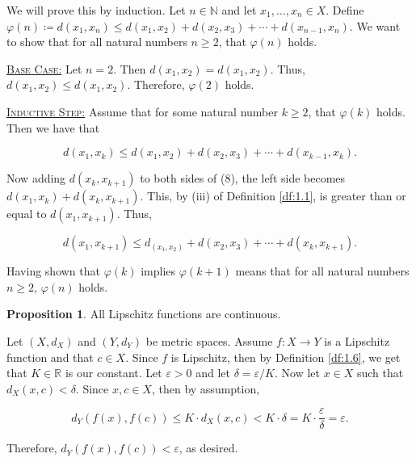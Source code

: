 \documentclass{article}
\makeatletter
\theoremstyle{definition}
\newtheorem{prop}{Proposition}[section]
\theoremstyle{remark}
\let\oldproofname=\proofname
\renewcommand{\proofname}{\bf{\textit{\oldproofname}}}
\theoremstyle{definition}
\renewenvironment{proof}[1][\proofname]{\par
  \pushQED{\qed}%
  \normalfont \topsep6\p@\@plus6\p@\relax
  \list{}{\leftmargin=0mm
          \rightmargin=0mm
          \settowidth{\itemindent}{\itshape#1}%
          \labelwidth=\itemindent
          \parsep=0pt \listparindent=0mm%
  }
  \item[\hskip\labelsep
        \itshape
    #1\@addpunct{.}]\ignorespaces
}{%
  \popQED\endlist\@endpefalse
}
\makeatother
\begin{document}
    \begin{proof}
        We will prove this by induction. Let $n\in\mathbb{N}$ and let $x_1,\dots,x_n\in X$. Define $\varphi(n)\coloneqq d(x_1,x_n)\leq d(x_1,x_2)+d(x_2,x_3)+\cdots+d(x_{n-1},x_n)$. We want to show that for all natural numbers $n\geq 2$, that $\varphi(n)$ holds.
        
        \vspace{4mm}
        
        \hspace{4mm}\underline{\textsc{Base Case:}} Let $n=2$. Then $d(x_1,x_2)=d(x_1,x_2)$. Thus, $d(x_1,x_2)\leq d(x_1,x_2)$. Therefore, $\varphi(2)$ holds.
        
        \vspace{4mm}
        
        \hspace{4mm}\underline{\textsc{Inductive Step:}} Assume that for some natural number $k\geq 2$, that $\varphi(k)$ holds. Then we have that 
        
        \begin{equation}
            d(x_1,x_k)\leq d(x_1,x_2)+d(x_2,x_3)+\cdots+d(x_{k-1},x_k).
        \end{equation}
        
        Now adding $d(x_k,x_{k+1})$ to both sides of (8), the left side becomes $d(x_1,x_k)+d(x_k,x_{k+1})$. This, by (iii) of Definition \ref{df:1.1}, is greater than or equal to $d(x_1,x_{k+1})$. Thus, 
        
        \begin{equation*}
            d(x_1,x_{k+1})\leq d_(x_1,x_2)+d(x_2,x_3)+\cdots+d(x_k,x_{k+1}).
        \end{equation*}
        
        Having shown that $\varphi(k)$ implies $\varphi(k+1)$ means that for all natural numbers $n\geq 2$, $\varphi(n)$ holds.
    \end{proof}
    
    \begin{prop}\label{prop:1.4} 
        All Lipschitz functions are continuous.
    \end{prop}
    
    \begin{proof}
        Let $(X,d_X)$ and $(Y,d_Y)$ be metric spaces. Assume $f\colon X\rightarrow Y$ is a Lipschitz function and that $c\in X$. Since $f$ is Lipschitz, then by Definition \ref{df:1.6}, we get that $K\in\mathbb{R}$ is our constant. Let $\varepsilon>0$ and let $\delta=\varepsilon/K$. Now let $x\in X$ such that $d_X(x,c)<\delta$. Since $x,c\in X$, then by assumption, 
        
        \begin{equation*}
            d_Y(f(x),f(c))\leq K\cdot d_X(x,c)<K\cdot\delta=K\cdot\frac{\varepsilon}{\delta}=\varepsilon.
        \end{equation*}
        
        Therefore, $d_Y(f(x),f(c))<\varepsilon$, as desired.
    \end{proof}
    
\end{document}
